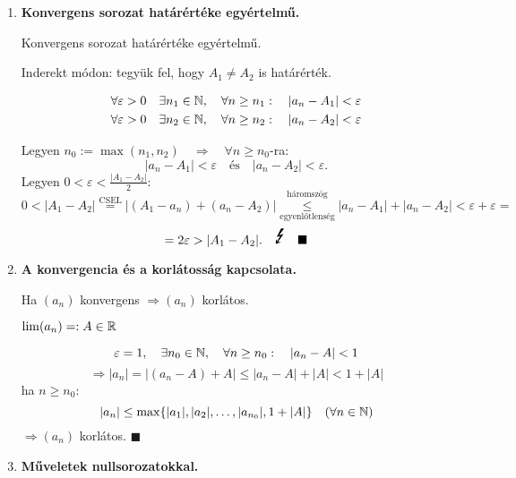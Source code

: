 \documentclass[a4paper,11.5pt]{article}
\begin{document}
\begin{enumerate}
\begin{enumerate}
		\end{enumerate}
		
		\item \textbf{Konvergens sorozat határértéke egyértelmű.}
		
		Konvergens sorozat határértéke egyértelmű.
		
		\biz Inderekt módon: tegyük fel, hogy $A_1\not=A_2$ is határérték.
		
		\[ \begin{gathered}
		\forall \varepsilon>0 \quad \exists n_1\in\mathbb{N}, \quad \forall n\geq n_1:\quad |a_n-A_1|<\varepsilon\\
		\forall \varepsilon>0 \quad \exists n_2\in\mathbb{N}, \quad \forall n\geq n_2:\quad |a_n-A_2|<\varepsilon\\
		\end{gathered}\]
		
		Legyen $n_0:=\max(n_1,n_2) \quad \Rightarrow\quad \forall n\geq n_0$-ra:
		\[|a_n-A_1|<\varepsilon\quad \text{és}\quad |a_n-A_2|<\varepsilon.  \]
		Legyen $0<\varepsilon<\displaystyle\frac{|A_1-A_2|}{2}$:
		\[ 0<|A_1-A_2|\overset{\text{CSEL}}{=}|(A_1-a_n)+(a_n-A_2)|\overset{\text{háromszög}}{\underset{\text{egyenlőtlenség}}{\leq}}|a_n-A_1|+|a_n-A_2|< \varepsilon+\varepsilon=\]\[=2\varepsilon>|A_1-A_2|.\quad \text{{\LARGE \Lightning}}\quad \blacksquare \]
		
		\item \textbf{A konvergencia és a korlátosság kapcsolata.}
		
		Ha $(a_n)$ konvergens $\Rightarrow (a_n)$ korlátos.
		
		\biz $\lim(a_n) =:A\in\mathbb{R}$
		
		\[ \varepsilon=1,\quad  \exists n_0 \in \mathbb{N},\quad \forall n\geq n_0:\quad |a_n-A|<1 \]
		\[ \Rightarrow |a_n|=|(a_n-A)+A|\leq|a_n-A|+|A|<1+|A| \]
		ha $n\geq n_0:$
		\[ |a_n|\leq \max\{ |a_1|,|a_2|,\ldots,|a_{n_0}|,1+|A| \} \quad (\forall n\in\mathbb{N}) \]
		$\Rightarrow (a_n)$ korlátos. \quad $\blacksquare$
		
		\pagebreak
		\item \textbf{Műveletek nullsorozatokkal.}
		

\end{enumerate}
\end{document}
